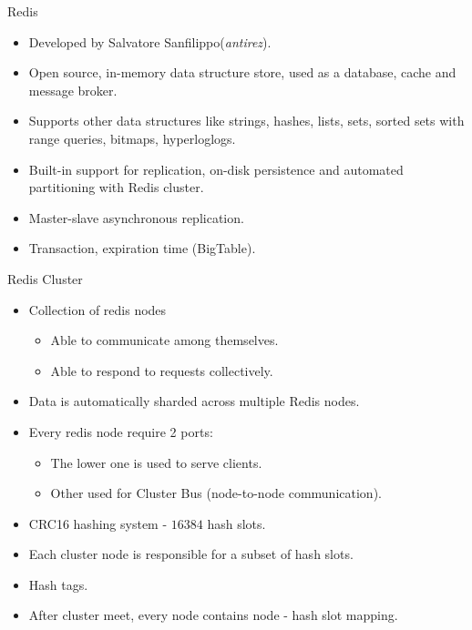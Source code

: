 \documentclass{beamer}
\begin{document}
\begin{frame}{Redis}
    \begin{itemize}
        \item Developed by Salvatore Sanfilippo(\textit{antirez}).
        \item Open source, in-memory data structure store, used as a database, cache and message broker.
        \item Supports other data structures like strings, hashes, lists, sets, sorted sets with range queries, bitmaps, hyperloglogs.
        \item Built-in support for replication, on-disk persistence and automated partitioning with Redis cluster.
        \item Master-slave asynchronous replication.
        \item Transaction, expiration time (BigTable).
    \end{itemize}
\end{frame}

\begin{frame}{Redis Cluster}
    \begin{itemize}
        \item Collection of redis nodes
            \begin{itemize}
                \item Able to communicate among themselves.
                \item Able to respond to requests collectively.
            \end{itemize}
        \item Data is automatically sharded across multiple Redis nodes.
        \item Every redis node require 2 ports:
            \begin{itemize}
                \item The lower one is used to serve clients.
                \item Other used for Cluster Bus (node-to-node communication).
            \end{itemize}
        \item CRC16 hashing system - $16384$ hash slots.
        \item Each cluster node is responsible for a subset of hash slots.
        \item Hash tags.
        \item After cluster meet, every node contains node - hash slot mapping.
    \end{itemize}
\end{frame}
\end{document}

